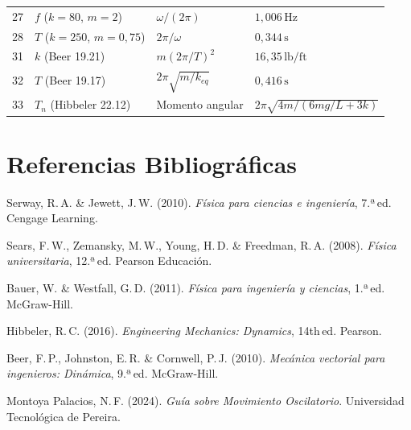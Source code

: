 \documentclass[12pt, a4paper, oneside]{book}
\begin{document}
\begin{center}
\begin{tabular}{clll}
27 & $f$ ($k{=}80$, $m{=}2$)                    & $\omega/(2\pi)$             & $1{,}006\,\text{Hz}$ \\
28 & $T$ ($k{=}250$, $m{=}0{,}75$)              & $2\pi/\omega$               & $0{,}344\,\text{s}$ \\
31 & $k$ (Beer 19.21)                           & $m(2\pi/T)^2$               & $16{,}35\,\text{lb/ft}$ \\
32 & $T$ (Beer 19.17)                           & $2\pi\sqrt{m/k_{eq}}$       & $0{,}416\,\text{s}$ \\
33 & $T_n$ (Hibbeler 22.12)                     & Momento angular             & $2\pi\sqrt{4m/(6mg/L+3k)}$ \\
\bottomrule
\end{tabular}
\end{center}

\chapter*{Referencias Bibliogr\'aficas}

\begin{enumerate}[leftmargin=*, label={[\arabic*]}]
  \item Serway, R.\,A. \& Jewett, J.\,W. (2010).
        \textit{F\'isica para ciencias e ingenier\'ia}, 7.ª\,ed. Cengage Learning.

  \item Sears, F.\,W., Zemansky, M.\,W., Young, H.\,D. \& Freedman, R.\,A. (2008).
        \textit{F\'isica universitaria}, 12.ª\,ed. Pearson Educaci\'on.

  \item Bauer, W. \& Westfall, G.\,D. (2011).
        \textit{F\'isica para ingenier\'ia y ciencias}, 1.ª\,ed. McGraw-Hill.

  \item Hibbeler, R.\,C. (2016).
        \textit{Engineering Mechanics: Dynamics}, 14th\,ed. Pearson.

  \item Beer, F.\,P., Johnston, E.\,R. \& Cornwell, P.\,J. (2010).
        \textit{Mec\'anica vectorial para ingenieros: Din\'amica}, 9.ª\,ed. McGraw-Hill.

  \item Montoya Palacios, N.\,F. (2024).
        \textit{Gu\'ia sobre Movimiento Oscilatorio}.
        Universidad Tecnol\'ogica de Pereira.
\end{enumerate}
\end{document}
